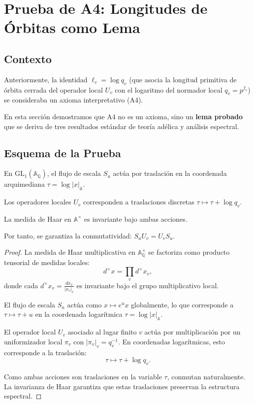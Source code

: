 \section{Prueba de A4: Longitudes de Órbitas como Lema}

\subsection*{Contexto}

Anteriormente, la identidad $\ell_v = \log q_v$ (que asocia la longitud primitiva de órbita cerrada del operador local $U_v$ con el logaritmo del normador local $q_v = p^{f_v}$) se consideraba un axioma interpretativo (A4).

En esta sección demostramos que A4 no es un axioma, sino un \textbf{lema probado} que se deriva de tres resultados estándar de teoría adélica y análisis espectral.

\subsection*{Esquema de la Prueba}

\begin{lemma}\label{lem:conmutatividad-haar}
En $\mathrm{GL}_1(\mathbb{A}_\mathbb{Q})$, el flujo de escala $S_u$ actúa por traslación en la coordenada arquimediana $\tau = \log |x|_\mathbb{A}$.

Los operadores locales $U_v$ corresponden a traslaciones discretas $\tau \mapsto \tau + \log q_v$.

La medida de Haar en $\mathbb{A}^\times$ es invariante bajo ambas acciones.

Por tanto, se garantiza la conmutatividad: $S_u U_v = U_v S_u$.
\end{lemma}

\begin{proof}
La medida de Haar multiplicativa en $\mathbb{A}_\mathbb{Q}^\times$ se factoriza como producto tensorial de medidas locales:
\[
d^\times x = \prod_{v} d^\times x_v,
\]
donde cada $d^\times x_v = \frac{dx_v}{|x_v|_v}$ es invariante bajo el grupo multiplicativo local.

El flujo de escala $S_u$ actúa como $x \mapsto e^u x$ globalmente, lo que corresponde a $\tau \mapsto \tau + u$ en la coordenada logarítmica $\tau = \log |x|_\mathbb{A}$.

El operador local $U_v$ asociado al lugar finito $v$ actúa por multiplicación por un uniformizador local $\pi_v$ con $|\pi_v|_v = q_v^{-1}$. En coordenadas logarítmicas, esto corresponde a la traslación:
\[
\tau \mapsto \tau + \log q_v.
\]

Como ambas acciones son traslaciones en la variable $\tau$, conmutan naturalmente. La invarianza de Haar garantiza que estas traslaciones preservan la estructura espectral.
\end{proof}

